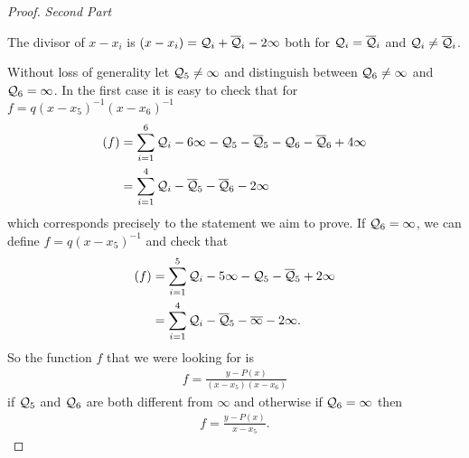 \documentclass[english,11pt,a4paper]{article}
\begin{document}
\begin{proof}
\newpage
  \textit{Second Part}

  The divisor of $x - x_i$ is $(x - x_i) = \mathcal{Q}_i + \overline {\mathcal{Q}}_i -2 \infty$ both for $\mathcal{Q}_i = \overline {\mathcal{Q}}_i$ and $\mathcal{Q}_i \neq \overline {\mathcal{Q}}_i$.

  Without loss of generality let $\mathcal{Q}_5 \neq \infty$ and distinguish between $\mathcal{Q}_6 \neq \infty$ and $\mathcal{Q}_6 = \infty$. In the first case it is easy to check that for $f = q (x - x_5)^{-1}(x - x_6)^{-1}$%
  \begin{align*}
    (f) &= \sum_{i=1}^6 \mathcal{Q}_i - 6 \infty - \mathcal{Q}_5 - \overline {\mathcal{Q}}_5 - \mathcal{Q}_6 - \overline {\mathcal{Q}}_6 + 4 \infty \\
        &= \sum_{i=1}^4 \mathcal{Q}_i- \overline {\mathcal{Q}}_5 - \overline {\mathcal{Q}}_6 - 2 \infty
  \end{align*}
  which corresponds precisely to the statement we aim to prove. If $\mathcal{Q}_6 = \infty$, we can define $f = q (x - x_5)^{-1}$ and check that
  \begin{align*}
    (f) &= \sum_{i=1}^5 \mathcal{Q}_i - 5 \infty - \mathcal{Q}_5 - \overline {\mathcal{Q}}_5 + 2 \infty \\
        &= \sum_{i=1}^4 \mathcal{Q}_i - \overline {\mathcal{Q}}_5 - \overline \infty - 2 \infty.
  \end{align*}
  So the function $f$ that we were looking for is
  \begin{align*}
    f = \frac{y-P(x)}{(x-x_5)(x-x_6)}
  \end{align*}
  if $\mathcal{Q}_5$ and $\mathcal{Q}_6$ are both different from $\infty$ and otherwise if $\mathcal{Q}_6 = \infty$ then
  \begin{align*}
    f = \frac{y-P(x)}{x-x_5}.
  \end{align*}
\end{proof}
\end{document}
